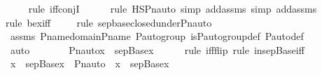 \begin{isabellebody}
\ \ \ \ \isamarkupfalse%
{\isacharparenleft}{\kern0pt}rule\ iff{\isacharunderscore}{\kern0pt}conjI{\isacharparenright}{\kern0pt}\isanewline
\ \ \ \ \ \isamarkupfalse%
{\isacharparenleft}{\kern0pt}rule\ HS{\isacharunderscore}{\kern0pt}Pn{\isacharunderscore}{\kern0pt}auto{\isacharcomma}{\kern0pt}\ simp\ add{\isacharcolon}{\kern0pt}assms{\isacharcomma}{\kern0pt}\ simp\ add{\isacharcolon}{\kern0pt}assms{\isacharparenright}{\kern0pt}\isanewline
\ \ \ \ \isamarkupfalse%
{\isacharparenleft}{\kern0pt}rule\ bex{\isacharunderscore}{\kern0pt}iff{\isacharparenright}{\kern0pt}\isanewline
\ \ \ \ \isamarkupfalse%
{\isacharparenleft}{\kern0pt}rule\ sep{\isacharunderscore}{\kern0pt}base{\isacharunderscore}{\kern0pt}closed{\isacharunderscore}{\kern0pt}under{\isacharunderscore}{\kern0pt}Pn{\isacharunderscore}{\kern0pt}auto{\isacharprime}{\kern0pt}{\isacharparenright}{\kern0pt}\isanewline
\ \ \ \ \isamarkupfalse%
\ assms\ P{\isacharunderscore}{\kern0pt}name{\isacharunderscore}{\kern0pt}domain{\isacharunderscore}{\kern0pt}P{\isacharunderscore}{\kern0pt}name\ {\isasymG}{\isacharunderscore}{\kern0pt}P{\isacharunderscore}{\kern0pt}auto{\isacharunderscore}{\kern0pt}group\ is{\isacharunderscore}{\kern0pt}P{\isacharunderscore}{\kern0pt}auto{\isacharunderscore}{\kern0pt}group{\isacharunderscore}{\kern0pt}def\ P{\isacharunderscore}{\kern0pt}auto{\isacharunderscore}{\kern0pt}def\ \isanewline
\ \ \ \ \isamarkupfalse%
\ auto\isanewline
\ \ \isamarkupfalse%
\ \isamarkupfalse%
\ {\isachardoublequoteopen}{\isachardot}{\kern0pt}{\isachardot}{\kern0pt}{\isachardot}{\kern0pt}\ {\isasymlongleftrightarrow}\ Pn{\isacharunderscore}{\kern0pt}auto{\isacharparenleft}{\kern0pt}{\isasympi}{\isacharparenright}{\kern0pt}{\isacharbackquote}{\kern0pt}x\ {\isasymin}\ sep{\isacharunderscore}{\kern0pt}Base{\isacharparenleft}{\kern0pt}x{}{\isacharparenright}{\kern0pt}{\isachardoublequoteclose}\ \isanewline
\ \ \ \ \isamarkupfalse%
{\isacharparenleft}{\kern0pt}rule\ iff{\isacharunderscore}{\kern0pt}flip{\isacharcomma}{\kern0pt}\ rule\ in{\isacharunderscore}{\kern0pt}sep{\isacharunderscore}{\kern0pt}Base{\isacharunderscore}{\kern0pt}iff{\isacharparenright}{\kern0pt}\isanewline
\ \ \ \ \isamarkupfalse%
\isanewline
\ \ \isamarkupfalse%
\ \isamarkupfalse%
\ {\isachardoublequoteopen}x\ {\isasymin}\ sep{\isacharunderscore}{\kern0pt}Base{\isacharparenleft}{\kern0pt}x{}{\isacharparenright}{\kern0pt}\ {\isasymlongleftrightarrow}\ Pn{\isacharunderscore}{\kern0pt}auto{\isacharparenleft}{\kern0pt}{\isasympi}{\isacharparenright}{\kern0pt}\ {\isacharbackquote}{\kern0pt}\ x\ {\isasymin}\ sep{\isacharunderscore}{\kern0pt}Base{\isacharparenleft}{\kern0pt}x{}{\isacharparenright}{\kern0pt}\ {\isachardoublequoteclose}\ \isamarkupfalse%

\end{isabellebody}
